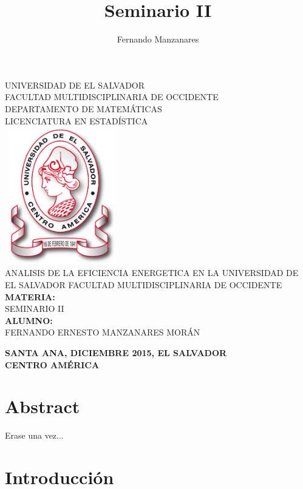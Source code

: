 \documentclass[12pt,letterpaper]{report}
\author{Fernando Manzanares}
\title{Seminario II}
\begin{document}



\thispagestyle{empty}

\begin{center}
UNIVERSIDAD DE EL SALVADOR \\ FACULTAD MULTIDISCIPLINARIA DE OCCIDENTE \\ DEPARTAMENTO DE MATEMÁTICAS \\
LICENCIATURA EN ESTADÍSTICA\\
\bigskip
\includegraphics [width=5cm,height=6cm]{Minerva}
\bigskip
\\ ANALISIS DE LA EFICIENCIA ENERGETICA EN LA UNIVERSIDAD DE EL SALVADOR FACULTAD MULTIDISCIPLINARIA DE OCCIDENTE \\
\bigskip
\textbf{MATERIA:}\\ 
SEMINARIO II\\
\textbf{ALUMNO:}\\ 
FERNANDO ERNESTO MANZANARES MORÁN\\
\bigskip
\bigskip
\bigskip
\bigskip
\bigskip
\bigskip

\textbf{SANTA ANA,    DICIEMBRE 2015,   EL SALVADOR}\\
\textbf{CENTRO AMÉRICA}\\


\end{center}



\tableofcontents 
\thispagestyle{empty}
\chapter*{Abstract}
Erase una vez...
\chapter*{Introducción}
\end{document}
